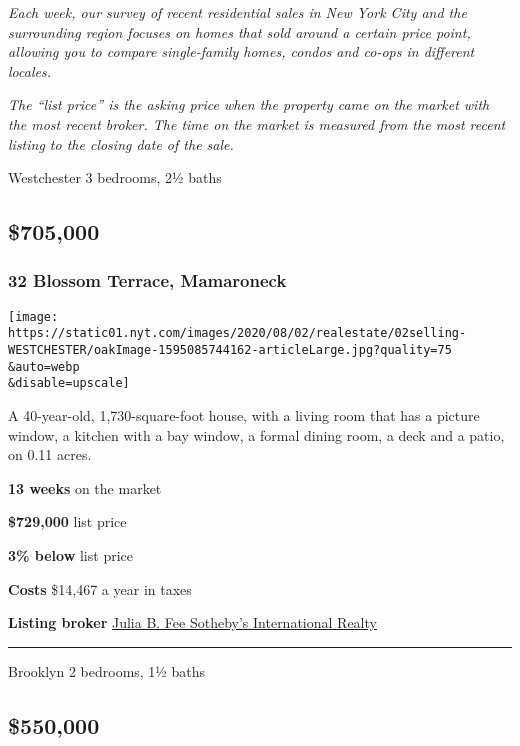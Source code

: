 \emph{Each week, our survey of recent residential sales in New York City
and the surrounding region focuses on homes that sold around a certain
price point, allowing you to compare single-family homes, condos and
co-ops in different locales.}

\emph{The ``list price'' is the asking price when the property came on
the market with the most recent broker. The time on the market is
measured from the most recent listing to the closing date of the sale.}

Westchester \textbar{} 3 bedrooms, 2½ baths

\hypertarget{705000}{%
\subsection{\$705,000}\label{705000}}

\hypertarget{32-blossom-terrace-mamaroneck}{%
\subsubsection{\texorpdfstring{\textbf{32 Blossom Terrace,
Mamaroneck}}{32 Blossom Terrace, Mamaroneck}}\label{32-blossom-terrace-mamaroneck}}

\texttt{[image: https://static01.nyt.com/images/2020/08/02/realestate/02selling-WESTCHESTER/oakImage-1595085744162-articleLarge.jpg?quality=75\\\&auto=webp\\\&disable=upscale]}

A 40-year-old, 1,730-square-foot house, with a living room that has a
picture window, a kitchen with a bay window, a formal dining room, a
deck and a patio, on 0.11 acres.

\textbf{13 weeks} on the market

\textbf{\$729,000} list price

\textbf{3\% below} list price

\textbf{Costs} \$14,467 a year in taxes

\textbf{Listing broker}
\href{https://www.williampitt.com/search/real-estate-sales/32-blossom-terrace-larchmont-ny-10538-6002521-2305389/}{Julia
B. Fee Sotheby's International Realty}

\begin{center}\rule{0.5\linewidth}{\linethickness}\end{center}

Brooklyn \textbar{} 2 bedrooms, 1½ baths

\hypertarget{550000}{%
\subsection{\$550,000}\label{550000}}

